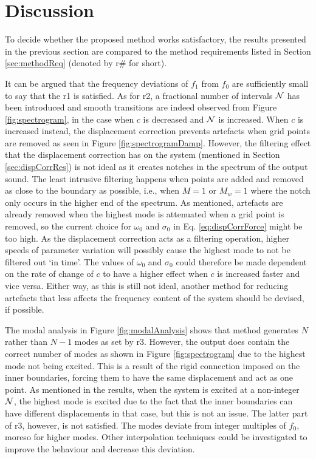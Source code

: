 \section{Discussion}\label{sec:discussion}
To decide whether the proposed method works satisfactory, the results presented in the previous section are compared to the method requirements listed in Section \ref{sec:methodReq} (denoted by r\# for short). 

It can be argued that the frequency deviations of $f_1$ from $f_0$ are sufficiently small to say that the r1 is satisfied. As for r2, a fractional number of intervals $\mathcal{N}$ has been introduced and smooth transitions are indeed observed from Figure \ref{fig:spectrogram}, in the case when $c$ is decreased and $\mathcal{N}$ is increased. When $c$ is increased instead, the displacement correction prevents artefacts when grid points are removed as seen in Figure \ref{fig:spectrogramDamp}. However, the filtering effect that the displacement correction has on the system (mentioned in Section \ref{sec:dispCorrRes}) is not ideal as it creates notches in the spectrum of the output sound. The least intrusive filtering happens when points are added and removed as close to the boundary as possible, i.e., when $M = 1$ or $M_w = 1$ where the notch only occurs in the higher end of the spectrum. As mentioned, artefacts are already removed when the highest mode is attenuated when a grid point is removed, so the current choice for $\omega_0$ and $\sigma_0$ in Eq. \eqref{eq:dispCorrForce} might be too high. As the displacement correction acts as a filtering operation, higher speeds of parameter variation will possibly cause the highest mode to not be filtered out `in time'. The values of $\omega_0$ and $\sigma_0$ could therefore be made dependent on the rate of change of $c$ to have a higher effect when $c$ is increased faster and vice versa.
Either way, as this is still not ideal, another method for reducing artefacts that less affects the frequency content of the system should be devised, if possible. 

The modal analysis in Figure \ref{fig:modalAnalysis} shows that method generates $N$ rather than $N - 1$ modes as set by r3. However, the output does contain the correct number of modes as shown in Figure \ref{fig:spectrogram} due to the highest mode not being excited. This is a result of the rigid connection imposed on the inner boundaries, forcing them to have the same displacement and act as one point. As mentioned in the results, when the system is excited at a non-integer $\mathcal{N}$, the highest mode is excited due to the fact that the inner boundaries can have different displacements in that case, but this is not an issue.
%
The latter part of r3, however, is not satisfied. The modes deviate from integer multiples of $f_0$, moreso for higher modes. Other interpolation techniques could be investigated to improve the behaviour and decrease this deviation.


